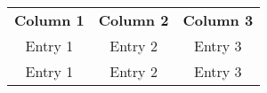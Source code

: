 \begin{tabular}{>{\small}c>{\small}c>{\small}c}	
\textbf{Column 1} & \textbf{Column 2} & \textbf{Column 3} \\
Entry 1 & Entry 2   & Entry 3 \\ 
Entry 1 & Entry 2   & Entry 3 \\ 
\end{tabular}%

